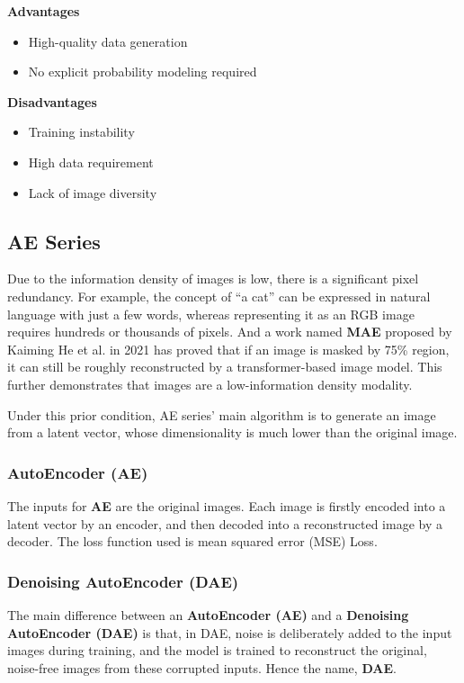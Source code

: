 \documentclass{article}
\begin{document}
\textbf{Advantages}
\begin{itemize}
    \item High-quality data generation
    \item No explicit probability modeling required
\end{itemize}

\textbf{Disadvantages}
\begin{itemize}
    \item Training instability
    \item High data requirement
    \item Lack of image diversity
\end{itemize}

\subsection{AE Series}

Due to the information density of images is low, there is a significant pixel redundancy. For example, the 
concept of ``a cat'' can be expressed in natural language with just a few words, whereas representing it as 
an RGB image requires hundreds or thousands of pixels. And a work named \textbf{MAE} proposed by Kaiming He 
et al. in 2021 has proved that if an image is masked by 75\% region, it can still be roughly reconstructed 
by a transformer-based image model. This further demonstrates that images are a low-information density 
modality.

Under this prior condition, AE series' main algorithm is to generate an image from a latent vector, whose 
dimensionality is much lower than the original image.

\subsubsection{AutoEncoder (AE)}

The inputs for \textbf{AE} are the original images. Each image is firstly encoded into a latent vector by an 
encoder, and then decoded into a reconstructed image by a decoder. The loss function used is mean squared 
error (MSE) Loss.

\subsubsection{Denoising AutoEncoder (DAE)}

The main difference between an \textbf{AutoEncoder (AE)} and a \textbf{Denoising AutoEncoder (DAE)} is that, 
in DAE, noise is deliberately added to the input images during training, and the model is trained to 
reconstruct the original, noise-free images from these corrupted inputs. Hence the name, \textbf{DAE}.
\end{document}
